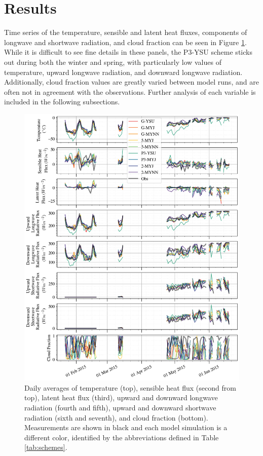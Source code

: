 \section{Results}

Time series of the temperature, sensible and latent heat fluxes, components of longwave and shortwave radiation, and cloud fraction can be seen in Figure \ref{fig:wrf_all}. While it is difficult to see fine details in these panels, the P3-YSU scheme sticks out during both the winter and spring, with particularly low values of temperature, upward longwave radiation, and downward longwave radiation. Additionally, cloud fraction values are greatly varied between model runs, and are often not in agreement with the observations. Further analysis of each variable is included in the following subsections.

\begin{figure}[p]
    \centering
        \vspace*{-1cm}
    \includegraphics[width=1\linewidth]{figures/chapter3/WRF_totaltimeseries.png}
    \caption[Polar WRF simulated temperature, pressure, sensible and latent heat flux, components of longwave and shortwave radiation, and cloud fraction time series.]{Daily averages of temperature (top), sensible heat flux (second from top), latent heat flux (third), upward and downward longwave radiation (fourth and fifth), upward and downward shortwave radiation (sixth and seventh), and cloud fraction (bottom). Measurements are shown in black and each model simulation is a different color, identified by the abbreviations defined in Table \ref{tab:schemes}.}
    \label{fig:wrf_all}
\end{figure}


